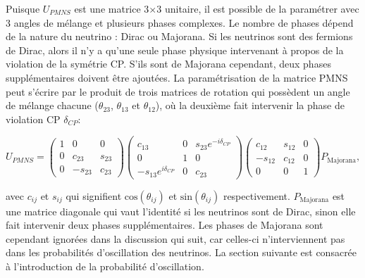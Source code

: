 Puisque $U_{PMNS}$ est une matrice 3$\times$3 unitaire, il est possible de la paramétrer avec 3 angles de mélange et plusieurs phases complexes. Le nombre de phases dépend de la nature du neutrino : Dirac ou Majorana. Si les neutrinos sont des fermions de Dirac, alors il n'y a qu'une seule phase physique intervenant à propos de la violation de la symétrie CP. S'ils sont de Majorana cependant, deux phases supplémentaires doivent être ajoutées. La paramétrisation de la matrice PMNS peut s'écrire par le produit de trois matrices de rotation qui possèdent un \og angle de mélange \fg{} chacune ($\theta_{23}$, $\theta_{13}$ et $\theta_{12}$), où la deuxième fait intervenir la phase de violation CP $\delta_{CP}$:

\begin{equation}
    U_{PMNS} = \left( \begin{matrix}
        1 & 0 & 0\\
        0 & c_{23} & s_{23} \\
        0 & -s_{23} & c_{23}
    \end{matrix} \right) \left( \begin{matrix}
        c_{13} & 0 & s_{23}e^{-i\delta_{CP}}\\
        0 & 1 & 0 \\
        -s_{13}e^{i\delta_{CP}} & 0 & c_{23}
    \end{matrix} \right) \left( \begin{matrix}
        c_{12} & s_{12} & 0\\
        -s_{12} & c_{12} & 0 \\
        0 & 0 & 1
    \end{matrix} \right) P_\textrm{Majorana},
\end{equation}

\bigbreak

avec $c_{ij}$ et $s_{ij}$ qui signifient $\textrm{cos}(\theta_{ij})$ et $\textrm{sin}(\theta_{ij})$ respectivement. $P_\textrm{Majorana}$ est une matrice diagonale qui vaut l'identité si les neutrinos sont de Dirac, sinon elle fait intervenir deux phases supplémentaires. Les phases de Majorana sont cependant ignorées dans la discussion qui suit, car celles-ci n'interviennent pas dans les probabilités d'oscillation des neutrinos. La section suivante est consacrée à l'introduction de la probabilité d'oscillation.\\


%


